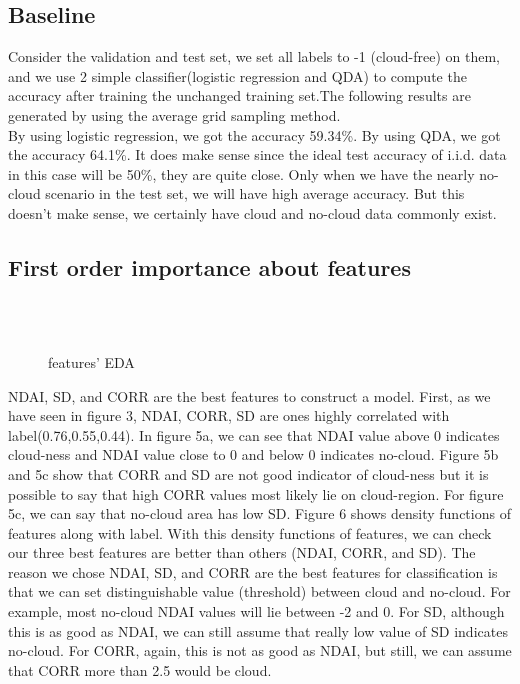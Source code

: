 \documentclass[12pt]{extarticle}
\begin{document}
\subsection{Baseline}
Consider the validation and test set, we set all labels to -1 (cloud-free) on them, and we use 2 simple classifier(logistic regression and QDA) to compute the accuracy after training the unchanged training set.The following results are generated by using the average grid sampling method.
\\By using logistic regression, we got the accuracy 59.34\%. By using QDA, we got the accuracy 64.1\%. It does make sense since the ideal test accuracy of i.i.d. data in this case will be 50\%, they are quite close. Only when we have the nearly no-cloud scenario in the test set, we will have high average accuracy. But this doesn't make sense, we certainly have cloud and no-cloud data commonly exist.

\subsection{First order importance about features}

\begin{figure}[htb]
\centering
{}
\\
\\

\caption{features' EDA}\label{fig 1}
\end{figure}

NDAI, SD, and CORR are the best features to construct a model. First, as we have seen in figure 3, NDAI, CORR, SD are ones highly correlated with label(0.76,0.55,0.44). In figure 5a, we can see that NDAI value above 0 indicates cloud-ness and NDAI value close to 0 and below 0 indicates no-cloud. Figure 5b and 5c show that CORR and SD are not good indicator of cloud-ness but it is possible to say that high CORR values most likely lie on cloud-region. For figure 5c, we can say that no-cloud area has low SD.  Figure 6 shows density functions of features along with label. With this density functions of features, we can check our three best features are better than others (NDAI, CORR, and SD). The reason we chose NDAI, SD, and CORR are the best features for classification is that we can set distinguishable value (threshold) between cloud and no-cloud. For example, most no-cloud NDAI values will lie between -2 and 0. For SD, although this is as good as NDAI, we can still assume that really low value of SD indicates no-cloud. For CORR, again, this is not as good as NDAI, but still, we can assume that CORR more than 2.5 would be cloud. 
\end{document}
